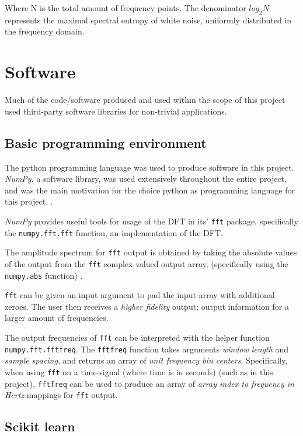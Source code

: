 \documentclass{kththesis}
\begin{document}
Where N is the total amount of frequency points.
The denominator \begin{math}log_2 N\end{math} represents the maximal spectral entropy of white noise, uniformly distributed in the frequency domain.

\section{Software}

Much of the code/software produced and used within the scope of this project used third-party software libraries for non-trivial applications.

\subsection{Basic programming environment}\label{NumPy BG}

The python programming language \parencite{Python} was used to produce software in this project.
\textit{NumPy}, a software library, was used extensively throughout the entire project, and was the main motivation for the choice python as programming language for this project. \parencite{numpy}.

\textit{NumPy} provides useful tools for usage of the DFT in its' \texttt{fft} package, specifically the \texttt{numpy.fft.fft} function, an implementation of the DFT. 

The amplitude spectrum for \texttt{fft} output is obtained by taking the absolute values of the output from the \texttt{fft} complex-valued output array, (specifically using the \texttt{numpy.abs} function) \parencite{numpy}.

\texttt{fft} can be given an input argument to pad the input array with additional zeroes. 
The user then receives a \textit{higher fidelity} output; output information for a larger amount of frequencies.

The output frequencies of \texttt{fft} can be interpreted with the helper function \texttt{numpy.fft.fftfreq}. 
The \texttt{fftfreq} function takes arguments \textit{window length} and \textit{sample spacing}, and returns an array of \textit{unit frequency bin centers}. 
Specifically, when using \texttt{fft} on a time-signal (where time is in seconds) (such as in this project), \texttt{fftfreq} can be used to produce an array of \textit{array index to frequency in Hertz} mappings for \texttt{fft} output.

\subsection{Scikit learn}\label{SK BG}
\end{document}
